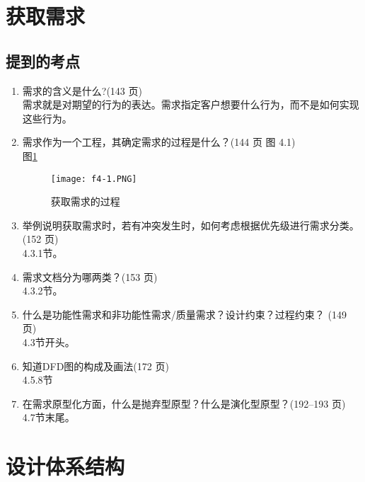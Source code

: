 \documentclass[14pt, letterpaper, UTF8, fontset=windowsnew, heading=true]{article}
\begin{document}
\section{获取需求}

\subsection{提到的考点}

\begin{enumerate}
	\item 需求的含义是什么?(143 页) \\
	需求就是对期望的行为的表达。需求指定客户想要什么行为，而不是如何实现这些行为。
	\item 需求作为一个工程，其确定需求的过程是什么？(144 页 图 4.1) \\图\ref{fig:collectrequirements}
	\begin{figure}[h]
		\centering
		\texttt{[image: f4-1.PNG]}
		\caption{获取需求的过程}
		\label{fig:collectrequirements}
	\end{figure}
	\item 举例说明获取需求时，若有冲突发生时，如何考虑根据优先级进行需求分类。(152 页) \\ 4.3.1节。
	\item 需求文档分为哪两类？(153 页) \\ 4.3.2节。
	\item 什么是功能性需求和非功能性需求/质量需求？设计约束？过程约束？ (149 页)
	\\ 4.3节开头。
	\item 知道DFD图的构成及画法(172 页) \\ 4.5.8节
	\item 在需求原型化方面，什么是抛弃型原型？什么是演化型原型？(192--193 页) \\
	4.7节末尾。
\end{enumerate}

\section{设计体系结构}
\end{document}
